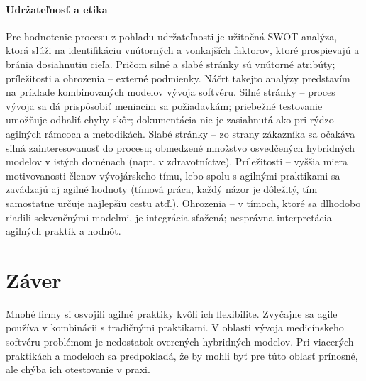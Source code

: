 \documentclass[10pt,twoside,slovak,a4paper]{article}
\begin{document}
\paragraph{Udržateľnosť a etika}
Pre hodnotenie procesu z pohľadu udržateľnosti je užitočná SWOT analýza, ktorá slúži na identifikáciu vnútorných a vonkajších faktorov, ktoré prospievajú a bránia dosiahnutiu cieľa. Pričom silné a slabé stránky sú vnútorné atribúty; príležitosti a ohrozenia – externé podmienky. Náčrt takejto analýzy predstavím na príklade kombinovaných modelov vývoja softvéru. Silné stránky – proces vývoja sa dá prispôsobiť meniacim sa požiadavkám; priebežné testovanie umožňuje odhaliť chyby skôr; dokumentácia nie je zasiahnutá ako pri rýdzo agilných rámcoch a metodikách. Slabé stránky – zo strany zákazníka sa očakáva silná zainteresovanosť do procesu; obmedzené množstvo osvedčených hybridných modelov v istých doménach (napr. v zdravotníctve). Príležitosti – vyššia miera motivovanosti členov vývojárskeho tímu, lebo spolu s agilnými praktikami sa zavádzajú aj agilné hodnoty (tímová práca, každý názor je dôležitý, tím samostatne určuje najlepšiu cestu atď.). Ohrozenia – v tímoch, ktoré sa dlhodobo riadili sekvenčnými modelmi, je integrácia sťažená; nesprávna interpretácia agilných praktík a hodnôt.

\section{Záver}
Mnohé firmy si osvojili agilné praktiky kvôli ich flexibilite. Zvyčajne sa agile používa v kombinácii s tradičnými praktikami. V oblasti vývoja medicínskeho softvéru problémom je nedostatok overených hybridných modelov. Pri viacerých praktikách a modeloch sa predpokladá, že by mohli byť pre túto oblasť prínosné, ale chýba ich otestovanie v praxi.


\end{document}
